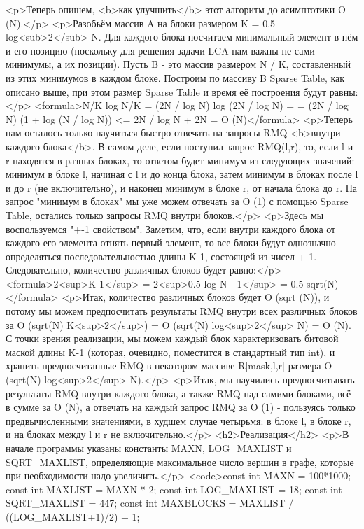 <p>Теперь опишем, <b>как улучшить</b> этот алгоритм до асимптотики O (N).</p>
<p>Разобьём массив A на блоки размером K = 0.5 log<sub>2</sub> N. Для каждого блока посчитаем минимальный элемент в нём и его позицию (поскольку для решения задачи LCA нам важны не сами минимумы, а их позиции). Пусть B - это массив размером N / K, составленный из этих минимумов в каждом блоке. Построим по массиву B Sparse Table, как описано выше, при этом размер Sparse Table и время её построения будут равны:</p>
<formula>N/K log N/K = (2N / log N) log (2N / log N) =
= (2N / log N) (1 + log (N / log N)) <= 2N / log N + 2N = O (N)</formula>
<p>Теперь нам осталось только научиться быстро отвечать на запросы RMQ <b>внутри каждого блока</b>. В самом деле, если поступил запрос RMQ(l,r), то, если l и r находятся в разных блоках, то ответом будет минимум из следующих значений: минимум в блоке l, начиная с l и до конца блока, затем минимум в блоках после l и до r (не включительно), и наконец минимум в блоке r, от начала блока до r. На запрос "минимум в блоках" мы уже можем отвечать за O (1) с помощью Sparse Table, остались только запросы RMQ внутри блоков.</p>
<p>Здесь мы воспользуемся "+-1 свойством". Заметим, что, если внутри каждого блока от каждого его элемента отнять первый элемент, то все блоки будут однозначно определяться последовательностью длины K-1, состоящей из чисел +-1. Следовательно, количество различных блоков будет равно:</p>
<formula>2<sup>K-1</sup> = 2<sup>0.5 log N - 1</sup> = 0.5 sqrt(N)</formula>
<p>Итак, количество различных блоков будет O (sqrt (N)), и потому мы можем предпосчитать результаты RMQ внутри всех различных блоков за O (sqrt(N) K<sup>2</sup>) = O (sqrt(N) log<sup>2</sup> N) = O (N). С точки зрения реализации, мы можем каждый блок характеризовать битовой маской длины K-1 (которая, очевидно, поместится в стандартный тип int), и хранить предпосчитанные RMQ в некотором массиве R[mask,l,r] размера O (sqrt(N) log<sup>2</sup> N).</p>
<p>Итак, мы научились предпосчитывать результаты RMQ внутри каждого блока, а также RMQ над самими блоками, всё в сумме за O (N), а отвечать на каждый запрос RMQ за O (1) - пользуясь только предвычисленными значениями, в худшем случае четырьмя: в блоке l, в блоке r, и на блоках между l и r не включительно.</p>
<h2>Реализация</h2>
<p>В начале программы указаны константы MAXN, LOG_MAXLIST и SQRT_MAXLIST, определяющие максимальное число вершин в графе, которые при необходимости надо увеличить.</p>
<code>const int MAXN = 100*1000;
const int MAXLIST = MAXN * 2;
const int LOG_MAXLIST = 18;
const int SQRT_MAXLIST = 447;
const int MAXBLOCKS = MAXLIST / ((LOG_MAXLIST+1)/2) + 1;


